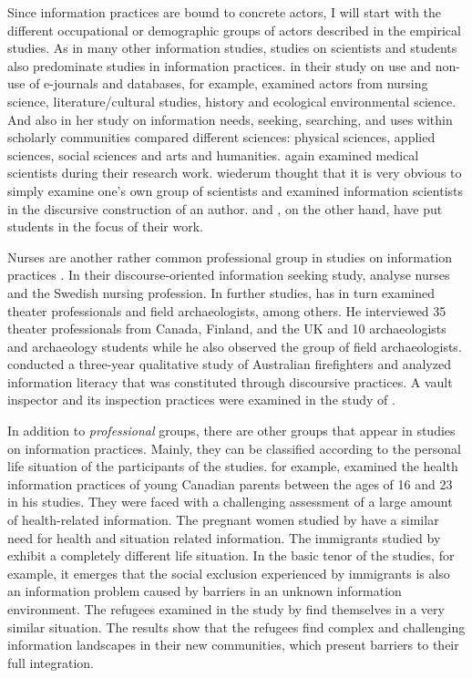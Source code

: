 \documentclass[12pt, a4paper, titlepage, oneside, abstract=true, toc=listof, toc=bibliography, BCOR=1cm]{scrreprt}
\begin{document}
Since information practices are bound to concrete actors, I will start with the different occupational or demographic groups of actors described in the empirical studies. As in many other information studies, studies on scientists and students also predominate studies in information practices. \citet{Talja2003} in their study on use and non-use of e-journals and databases, for example, examined actors from nursing science, literature/cultural studies, history and ecological environmental science. And also \citet{Fry2006} in her study on information needs, seeking, searching, and uses within scholarly communities compared different sciences: physical sciences, applied sciences, social sciences and arts and humanities. \citet{Roos2015} again examined medical scientists during their research work. \citet{Olsson2007} wiederum thought that it is very obvious to simply examine one's own group of scientists and examined information scientists in the discursive construction of an author. \citep{Boyum2015} and \citep{AhenkorahMarfo2016}, on the other hand, have put students in the focus of their work. 

Nurses are another rather common professional group in studies on information practices \citep[e.g. ][]{Bonner2011, Johannisson2007, Mohammad2020}. In their discourse-oriented information seeking study, \citet{Johannisson2007} analyse nurses and the Swedish nursing profession. In further studies, \citet{Olsson2010, Olsson2016} has in turn examined theater professionals and field archaeologists, among others. He interviewed 35 theater professionals from Canada, Finland, and the UK and 10 archaeologists and archaeology students while he also observed the group of field archaeologists. \citep{Lloyd2007} conducted a three-year qualitative study of Australian firefighters and analyzed information literacy that was constituted through discoursive practices. A vault inspector and its inspection practices were examined in the study of \citep{Veinot2007}. 

In addition to \textit{professional} groups, there are other groups that appear in studies on information practices. Mainly, they can be classified according to the personal life situation of the participants of the studies. \citet{Greyson2017, Greyson2018} for example, examined the health information practices of young Canadian parents between the ages of 16 and 23 in his studies. They were faced with a challenging assessment of a large amount of health-related information. The pregnant women studied by \citet{McKenzie2002, McKenzie2003, McKenzie2003a} have a similar need for health and situation related information. The immigrants studied by \citet{Caidi2008, Caidi2008a, Caidi2010} exhibit a completely different life situation. In the basic tenor of the studies, for example, it emerges that the social exclusion experienced by immigrants is also an information problem caused by barriers in an unknown information environment. The refugees examined in the study by \citet{Lloyd2013} find themselves in a very similar situation. The results show that the refugees find complex and challenging information landscapes in their new communities, which present barriers to their full integration. 
\end{document}

